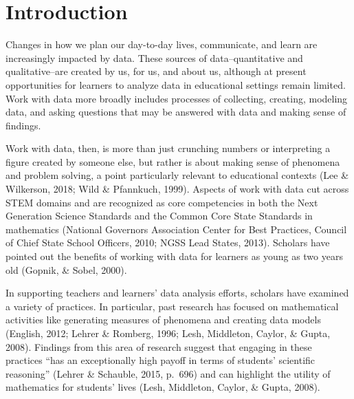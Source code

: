 \documentclass[]{msu-thesis}
\theoremstyle{definition}
\theoremstyle{definition}
\theoremstyle{definition}
\theoremstyle{remark}
\begin{document}
\SingleSpacing
\tableofcontents* %
\clearpage
\listoftables %
\clearpage
\listoffigures %
\mainmatter
%

\chapter{Introduction}\label{intro}

\DoubleSpacing

Changes in how we plan our day-to-day lives, communicate, and learn are
increasingly impacted by data. These sources of data--quantitative and
qualitative--are created by us, for us, and about us, although at
present opportunities for learners to analyze data in educational
settings remain limited. Work with data more broadly includes processes
of collecting, creating, modeling data, and asking questions that may be
answered with data and making sense of findings.

Work with data, then, is more than just crunching numbers or
interpreting a figure created by someone else, but rather is about
making sense of phenomena and problem solving, a point particularly
relevant to educational contexts (Lee \& Wilkerson, 2018; Wild \&
Pfannkuch, 1999). Aspects of work with data cut across STEM domains and
are recognized as core competencies in both the Next Generation Science
Standards and the Common Core State Standards in mathematics (National
Governors Association Center for Best Practices, Council of Chief State
School Officers, 2010; NGSS Lead States, 2013). Scholars have pointed
out the benefits of working with data for learners as young as two years
old (Gopnik, \& Sobel, 2000).

In supporting teachers and learners' data analysis efforts, scholars
have examined a variety of practices. In particular, past research has
focused on mathematical activities like generating measures of phenomena
and creating data models (English, 2012; Lehrer \& Romberg, 1996; Lesh,
Middleton, Caylor, \& Gupta, 2008). Findings from this area of research
suggest that engaging in these practices ``has an exceptionally high
payoff in terms of students' scientific reasoning'' (Lehrer \& Schauble,
2015, p.~696) and can highlight the utility of mathematics for students'
lives (Lesh, Middleton, Caylor, \& Gupta, 2008).
\end{document}
